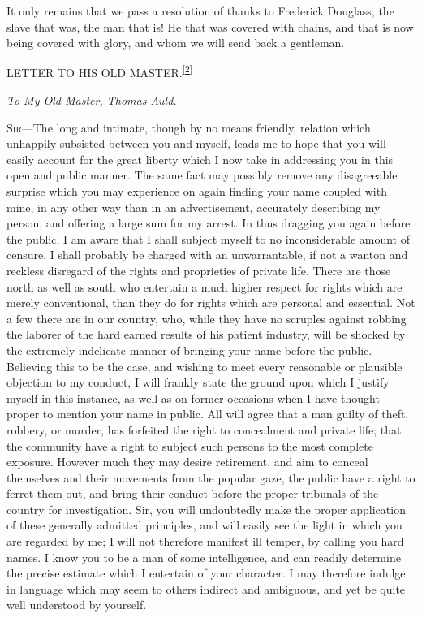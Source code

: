 It only remains that we pass a resolution of thanks to Frederick
Douglass, the slave that was, the man that is! He that was covered with
chains, and that is now being covered with glory, and whom we will send
back a gentleman.

{\protect\hypertarget{ux5cux7bux5cux7bux5cux7b1ux5cux7dux5cux7dux5cux7d}{}{}}

{}

{LETTER TO HIS OLD
MASTER.\textsuperscript{\protect\hyperlink{cite_note-2}{{[}2{]}}}}

\emph{To My Old Master, Thomas Auld.}

\textsc{Sir}---The long and intimate, though by no means friendly,
relation which unhappily subsisted between you and myself, leads me to
hope that you will easily account for the great liberty which I now take
in addressing you in this open and public manner. The same fact may
possibly remove any disagreeable surprise which you may experience on
again finding your name coupled with mine, in any other way than in an
advertisement, accurately describing my person, and offering a large sum
for my arrest. In thus dragging you again before the public, I am aware
that I shall subject myself to no inconsiderable amount of censure. I
shall probably be charged with an unwarrantable, if not a wanton and
reckless disregard of the rights and proprieties of private life. There
are those north as well as south who entertain a much higher respect for
rights which are merely conventional, than they do for rights which are
personal and essential. Not a few there are in our country, who, while
they have no scruples against robbing the laborer of the hard earned
results of his patient industry, will be shocked by the extremely
indelicate manner of bringing your name before the public. Believing
this to be the case, and wishing to meet every reasonable or plausible
objection to my conduct, I will frankly state the ground upon which I
justify myself in this instance, as well as on former occasions when I
have thought proper to mention your name in public. All will agree that
a man guilty of theft, robbery, or murder, has forfeited the right to
concealment and private life; that the community have a right to subject
such persons to the most complete exposure. However much they may desire
{}retirement, and aim to conceal themselves and their movements from the
popular gaze, the public have a right to ferret them out, and bring
their conduct before the proper tribunals of the country for
investigation. Sir, you will undoubtedly make the proper application of
these generally admitted principles, and will easily see the light in
which you are regarded by me; I will not therefore manifest ill temper,
by calling you hard names. I know you to be a man of some intelligence,
and can readily determine the precise estimate which I entertain of your
character. I may therefore indulge in language which may seem to others
indirect and ambiguous, and yet be quite well understood by yourself.

